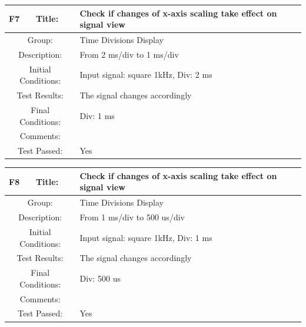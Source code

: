 \documentclass[12pt]{article}
\begin{document}
		\begin{table}[H]
	\begin{center}
		\begin{tabular}{| m{2cm}|m{2cm}|m{12cm}|}
			\hline 
			\bf F7&\bf Title:&\bf Check if changes of x-axis scaling take effect on signal view\\ 
			\hline 
			\multicolumn{2}{|c|}{Group:}&Time Divisions Display\\ 
			\hline 
			\multicolumn{2}{|c|}{Description:}&From 2 ms/div to 1 ms/div\\ 
			\hline 
			\multicolumn{2}{|c|}{Initial Conditions:}&Input signal: square 1kHz, Div: 2 ms\\ 
			\hline 
			\multicolumn{2}{|c|}{Test Results:}&The signal changes accordingly\\ 
			\hline 
			\multicolumn{2}{|c|}{Final Conditions:}&Div: 1 ms \\ 
			\hline 
			\multicolumn{2}{|c|}{Comments:}&\\ 
			\hline 
			\multicolumn{2}{|c|}{Test Passed:}&Yes \\ 
			\hline 
		\end{tabular} 
	\end{center}
\end{table}	
		\begin{table}[H]
	\begin{center}
		\begin{tabular}{| m{2cm}|m{2cm}|m{12cm}|}
			\hline 
			\bf F8&\bf Title:&\bf Check if changes of x-axis scaling take effect on signal view\\ 
			\hline 
			\multicolumn{2}{|c|}{Group:}&Time Divisions Display\\ 
			\hline 
			\multicolumn{2}{|c|}{Description:}&From 1 ms/div to 500 us/div\\ 
			\hline 
			\multicolumn{2}{|c|}{Initial Conditions:}&Input signal: square 1kHz, Div: 1 ms\\ 
			\hline 
			\multicolumn{2}{|c|}{Test Results:}&The signal changes accordingly\\ 
			\hline 
			\multicolumn{2}{|c|}{Final Conditions:}&Div: 500 us\\ 
			\hline 
			\multicolumn{2}{|c|}{Comments:}&\\ 
			\hline 
			\multicolumn{2}{|c|}{Test Passed:}&Yes \\ 
			\hline 
		\end{tabular} 
	\end{center}
\end{table}	
\end{document}
